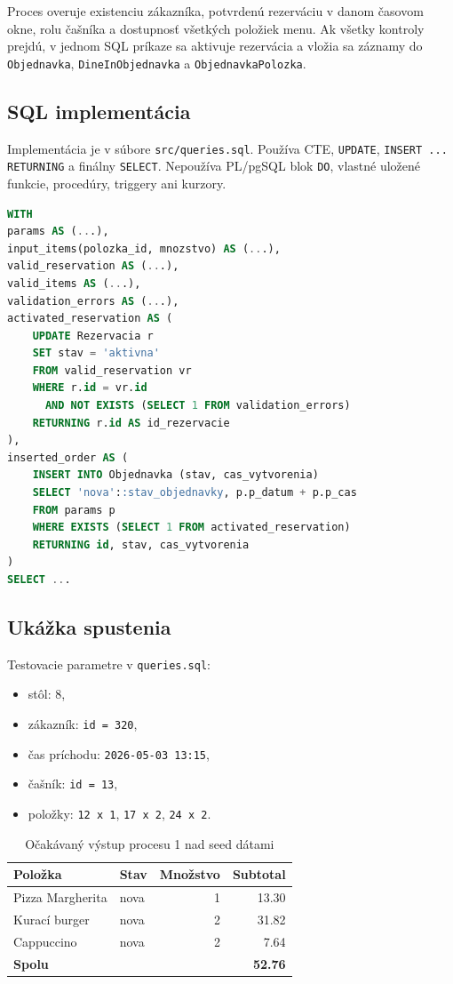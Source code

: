 \documentclass[11pt, a4paper]{article}
\begin{document}
Proces overuje existenciu zákazníka, potvrdenú rezerváciu v danom časovom okne, rolu čašníka a
dostupnosť všetkých položiek menu. Ak všetky kontroly prejdú, v jednom SQL príkaze sa aktivuje
rezervácia a vložia sa záznamy do \texttt{Objednavka}, \texttt{DineInObjednavka} a
\texttt{ObjednavkaPolozka}.

\subsection*{SQL implementácia}

Implementácia je v súbore \texttt{src/queries.sql}. Používa CTE, \texttt{UPDATE},
\texttt{INSERT ... RETURNING} a finálny \texttt{SELECT}. Nepoužíva PL/pgSQL blok
\texttt{DO}, vlastné uložené funkcie, procedúry, triggery ani kurzory.

\begin{lstlisting}[language=SQL]
WITH
params AS (...),
input_items(polozka_id, mnozstvo) AS (...),
valid_reservation AS (...),
valid_items AS (...),
validation_errors AS (...),
activated_reservation AS (
    UPDATE Rezervacia r
    SET stav = 'aktivna'
    FROM valid_reservation vr
    WHERE r.id = vr.id
      AND NOT EXISTS (SELECT 1 FROM validation_errors)
    RETURNING r.id AS id_rezervacie
),
inserted_order AS (
    INSERT INTO Objednavka (stav, cas_vytvorenia)
    SELECT 'nova'::stav_objednavky, p.p_datum + p.p_cas
    FROM params p
    WHERE EXISTS (SELECT 1 FROM activated_reservation)
    RETURNING id, stav, cas_vytvorenia
)
SELECT ...
\end{lstlisting}

\subsection*{Ukážka spustenia}

Testovacie parametre v \texttt{queries.sql}:
\begin{itemize}
    \item stôl: 8,
    \item zákazník: \texttt{id = 320},
    \item čas príchodu: \texttt{2026-05-03 13:15},
    \item čašník: \texttt{id = 13},
    \item položky: \texttt{12 x 1}, \texttt{17 x 2}, \texttt{24 x 2}.
\end{itemize}

\begin{table}[H]
\centering
\small
\begin{tabular}{llrr}
\toprule
\textbf{Položka} & \textbf{Stav} & \textbf{Množstvo} & \textbf{Subtotal} \\
\midrule
Pizza Margherita & nova & 1 & 13.30 \\
Kurací burger & nova & 2 & 31.82 \\
Cappuccino & nova & 2 & 7.64 \\
\midrule
\textbf{Spolu} & & & \textbf{52.76} \\
\bottomrule
\end{tabular}
\caption{Očakávaný výstup procesu 1 nad seed dátami}
\end{table}
\end{document}
